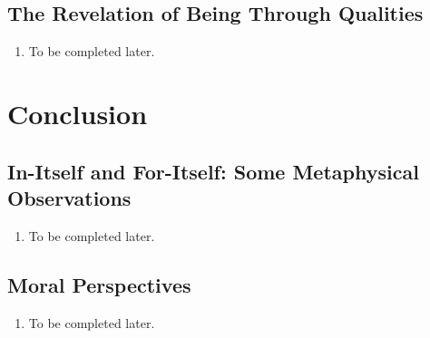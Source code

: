 \subsection{The Revelation of Being Through Qualities}

\begin{enumerate}
  \item To be completed later.
\end{enumerate}

\section{Conclusion}

\subsection{In-Itself and For-Itself: Some Metaphysical Observations}

\begin{enumerate}
  \item To be completed later.
\end{enumerate}

\subsection{Moral Perspectives}

\begin{enumerate}
  \item To be completed later.
\end{enumerate}
